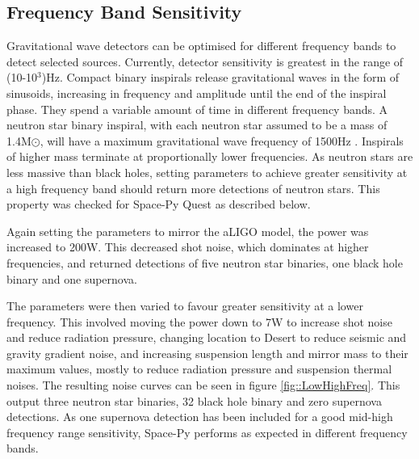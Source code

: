 \documentclass{article}
\begin{document}
\subsection{Frequency Band Sensitivity}
\label{sec::fband}
Gravitational wave detectors can be optimised for different frequency bands to detect selected sources. Currently, detector sensitivity is greatest in the range of (10-10$^3$)Hz. Compact binary inspirals release gravitational waves in the form of sinusoids, increasing in frequency and amplitude until the end of the inspiral phase. They spend a variable amount of time in different frequency bands. A neutron star binary inspiral, with each neutron star assumed to be a mass of 1.4M$\odot$, will have a maximum gravitational wave frequency of 1500Hz \cite{LIGO}. Inspirals of higher mass terminate at proportionally lower frequencies. As neutron stars are less massive than black holes, setting parameters to achieve greater sensitivity at a high frequency band should return more detections of neutron stars. This property was checked for Space-Py Quest as described below. 

Again setting the parameters to mirror the aLIGO model, the power was increased to 200W. This decreased shot noise, which dominates at higher frequencies, and returned detections of five neutron star binaries, one black hole binary and one supernova. 

The parameters were then varied to favour greater sensitivity at a lower frequency. This involved moving the power down to 7W to increase shot noise and reduce radiation pressure, changing location to Desert to reduce seismic and gravity gradient noise, and increasing suspension length and mirror mass to their maximum values, mostly to reduce radiation pressure and suspension thermal noises. The resulting noise curves can be seen in figure \ref{fig::LowHighFreq}. This output three neutron star binaries, 32 black hole binary and zero supernova detections. As one supernova detection has been included for a good mid-high frequency range sensitivity, Space-Py performs as expected in different frequency bands. 
\end{document}

